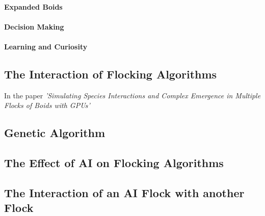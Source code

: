 	\paragraph{Expanded Boids} %
	
	
	\paragraph{Decision Making}
	
	
	\paragraph{Learning and Curiosity}
	
	

\subsection{The Interaction of Flocking Algorithms}
In the paper \textit{'Simulating Species Interactions and Complex Emergence in Multiple Flocks of Boids with GPUs'} \citet{husselmannsimulating}


\subsection{Genetic Algorithm}


\subsection{The Effect of AI on Flocking Algorithms}




\subsection{The Interaction of an AI Flock with another Flock}












